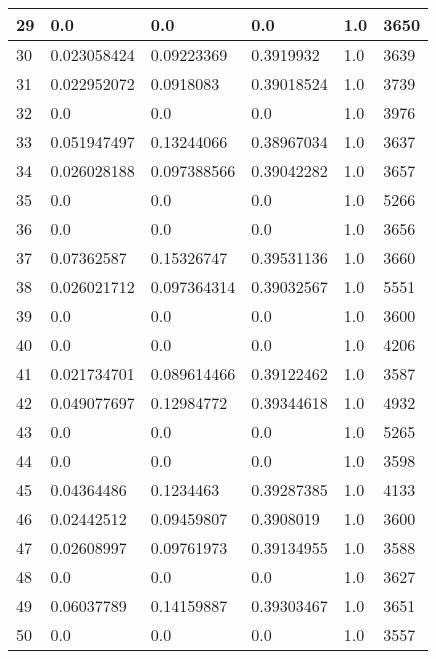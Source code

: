 \begin{longtable}{|l|l|l|l|l|l|}
29 & 0.0 & 0.0 & 0.0 & 1.0 & 3650 \\ \hline 
30 & 0.023058424 & 0.09223369 & 0.3919932 & 1.0 & 3639 \\ \hline 
31 & 0.022952072 & 0.0918083 & 0.39018524 & 1.0 & 3739 \\ \hline 
32 & 0.0 & 0.0 & 0.0 & 1.0 & 3976 \\ \hline 
33 & 0.051947497 & 0.13244066 & 0.38967034 & 1.0 & 3637 \\ \hline 
34 & 0.026028188 & 0.097388566 & 0.39042282 & 1.0 & 3657 \\ \hline 
35 & 0.0 & 0.0 & 0.0 & 1.0 & 5266 \\ \hline 
36 & 0.0 & 0.0 & 0.0 & 1.0 & 3656 \\ \hline 
37 & 0.07362587 & 0.15326747 & 0.39531136 & 1.0 & 3660 \\ \hline 
38 & 0.026021712 & 0.097364314 & 0.39032567 & 1.0 & 5551 \\ \hline 
39 & 0.0 & 0.0 & 0.0 & 1.0 & 3600 \\ \hline 
40 & 0.0 & 0.0 & 0.0 & 1.0 & 4206 \\ \hline 
41 & 0.021734701 & 0.089614466 & 0.39122462 & 1.0 & 3587 \\ \hline 
42 & 0.049077697 & 0.12984772 & 0.39344618 & 1.0 & 4932 \\ \hline 
43 & 0.0 & 0.0 & 0.0 & 1.0 & 5265 \\ \hline 
44 & 0.0 & 0.0 & 0.0 & 1.0 & 3598 \\ \hline 
45 & 0.04364486 & 0.1234463 & 0.39287385 & 1.0 & 4133 \\ \hline 
46 & 0.02442512 & 0.09459807 & 0.3908019 & 1.0 & 3600 \\ \hline 
47 & 0.02608997 & 0.09761973 & 0.39134955 & 1.0 & 3588 \\ \hline 
48 & 0.0 & 0.0 & 0.0 & 1.0 & 3627 \\ \hline 
49 & 0.06037789 & 0.14159887 & 0.39303467 & 1.0 & 3651 \\ \hline 
50 & 0.0 & 0.0 & 0.0 & 1.0 & 3557 \\ \hline 
\end{longtable}
